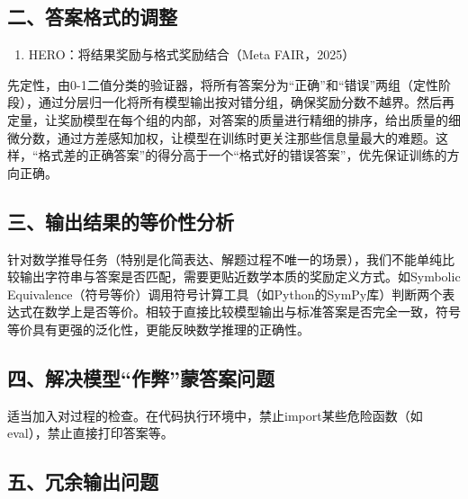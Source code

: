 \hypertarget{ux4e8cux7b54ux6848ux683cux5f0fux7684ux8c03ux6574}{%
\subsection{二、答案格式的调整}\label{ux4e8cux7b54ux6848ux683cux5f0fux7684ux8c03ux6574}}

\begin{enumerate}
\def\labelenumi{\arabic{enumi}.}
\tightlist
\item
  HERO：将结果奖励与格式奖励结合（Meta FAIR，2025）
\end{enumerate}

先定性，由0-1二值分类的验证器，将所有答案分为``正确''和``错误''两组（定性阶段），通过分层归一化将所有模型输出按对错分组，确保奖励分数不越界。然后再定量，让奖励模型在每个组的内部，对答案的质量进行精细的排序，给出质量的细微分数，通过方差感知加权，让模型在训练时更关注那些信息量最大的难题。这样，``格式差的正确答案''的得分高于一个``格式好的错误答案''，优先保证训练的方向正确。

\hypertarget{ux4e09ux8f93ux51faux7ed3ux679cux7684ux7b49ux4ef7ux6027ux5206ux6790}{%
\subsection{三、输出结果的等价性分析}\label{ux4e09ux8f93ux51faux7ed3ux679cux7684ux7b49ux4ef7ux6027ux5206ux6790}}

针对数学推导任务（特别是化简表达、解题过程不唯一的场景），我们不能单纯比较输出字符串与答案是否匹配，需要更贴近数学本质的奖励定义方式。如Symbolic Equivalence（符号等价）调用符号计算工具（如Python的SymPy库）判断两个表达式在数学上是否等价。相较于直接比较模型输出与标准答案是否完全一致，符号等价具有更强的泛化性，更能反映数学推理的正确性。

\hypertarget{ux56dbux89e3ux51b3ux6a21ux578bux4f5cux5f0aux8499ux7b54ux6848ux95eeux9898}{%
\subsection{四、解决模型``作弊''蒙答案问题}\label{ux56dbux89e3ux51b3ux6a21ux578bux4f5cux5f0aux8499ux7b54ux6848ux95eeux9898}}

适当加入对过程的检查。在代码执行环境中，禁止import某些危险函数（如eval），禁止直接打印答案等。

\hypertarget{ux4e94ux5197ux4f59ux8f93ux51faux95eeux9898}{%
\subsection{五、冗余输出问题}\label{ux4e94ux5197ux4f59ux8f93ux51faux95eeux9898}}

